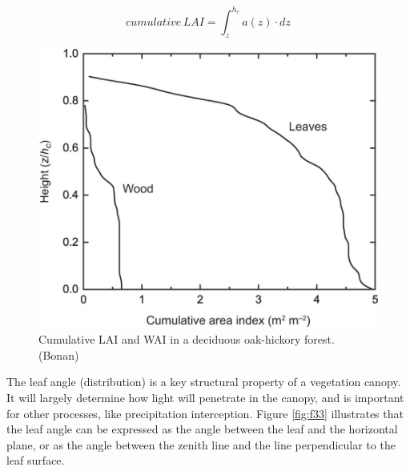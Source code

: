 \documentclass[
  12pt,
  oneside]{book}
\begin{document}
\[
cumulative \, LAI = \int_z^{h_c}a(z) \cdot dz
\]

\begin{figure}

{\centering \includegraphics[width=0.8\linewidth]{figures/chap3/f32_cLAI} 

}

\caption{Cumulative LAI and WAI in a deciduous oak-hickory forest. (Bonan)}\label{fig:f32}
\end{figure}

The leaf angle (distribution) is a key structural property of a vegetation canopy. It will largely determine how light will penetrate in the canopy, and is important for other processes, like precipitation interception. Figure \ref{fig:f33} illustrates that the leaf angle can be expressed as the angle between the leaf and the horizontal plane, or as the angle between the zenith line and the line perpendicular to the leaf surface.
\end{document}
